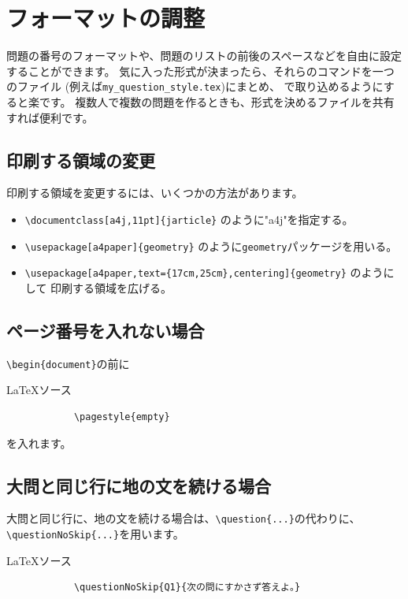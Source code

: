 \documentclass[dvipdfmx,a4j,11pt]{jarticle}
\newenvironment{inputbox}{%
	\begin{itembox}[r]{\LaTeX ソース}
}{
	\end{itembox}
}
\begin{document}
\clearpage
\section{フォーマットの調整}
	問題の番号のフォーマットや、問題のリストの前後のスペースなどを自由に設定することができます。
	気に入った形式が決まったら、それらのコマンドを一つのファイル
	(例えば{\tt \verb"my_question_style.tex"})にまとめ、
	{\tt \verb""}で取り込めるようにすると楽です。
	複数人で複数の問題を作るときも、形式を決めるファイルを共有すれば便利です。
	
\subsection{印刷する領域の変更}
	印刷する領域を変更するには、いくつかの方法があります。
	\begin{itemize}
		\item {\tt \verb"\documentclass[a4j,11pt]{jarticle}"} のように"a4j"を指定する。
		\item {\tt \verb"\usepackage[a4paper]{geometry}"} のように{\tt geometry}パッケージを用いる。
		\item {\tt \verb"\usepackage[a4paper,text={17cm,25cm},centering]{geometry}"} のようにして
			印刷する領域を広げる。
	\end{itemize}
	
\subsection{ページ番号を入れない場合}
	{\tt \verb"\begin{document}"}の前に
	\begin{inputbox}
		\begin{verbatim}
			\pagestyle{empty}
		\end{verbatim}
	\end{inputbox}
	を入れます。
	
\subsection{大問と同じ行に地の文を続ける場合}
	大問と同じ行に、地の文を続ける場合は、{\tt \verb"\question{...}"}の代わりに、
	{\tt \verb"\questionNoSkip{...}"}を用います。
	\begin{inputbox}
		\begin{verbatim}
			\questionNoSkip{Q1}{次の問にすかさず答えよ。}
		\end{verbatim}
	\end{inputbox}
	
\end{document}
